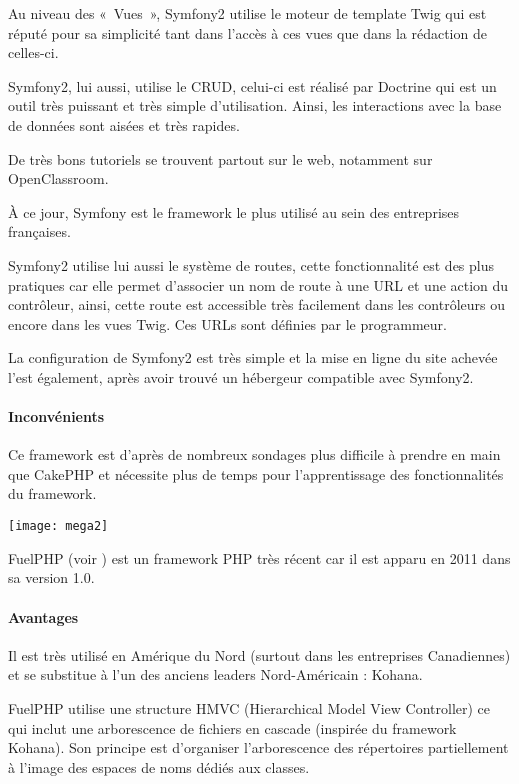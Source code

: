 Au niveau des «~Vues~», Symfony2 utilise le moteur de template Twig qui est réputé pour sa simplicité tant dans l'accès à ces vues que dans la rédaction de celles-ci.

Symfony2, lui aussi, utilise le CRUD, celui-ci est réalisé par Doctrine qui est un outil très puissant et très simple d'utilisation. Ainsi, les interactions avec la base de données sont aisées et très rapides.

De très bons tutoriels se trouvent partout sur le web, notamment sur OpenClassroom.

À ce jour, Symfony est le framework le plus utilisé au sein des entreprises françaises.

Symfony2 utilise lui aussi le système de routes, cette fonctionnalité est des plus pratiques car elle permet d'associer un nom de route à une URL et une action du contrôleur, ainsi, cette route est accessible très facilement dans les contrôleurs ou encore dans les vues Twig. Ces URLs sont définies par le programmeur.

La configuration de Symfony2 est très simple et la mise en ligne du site achevée l'est également, après avoir trouvé un hébergeur compatible avec Symfony2.

\paragraph{Inconvénients}
Ce framework est d'après de nombreux sondages plus difficile à prendre en main que CakePHP et nécessite plus de temps pour l'apprentissage des fonctionnalités du framework.


\begin{center}\texttt{[image: mega2]}\end{center}

FuelPHP (voir \cite{fuel}) est un framework PHP très récent car il est apparu en 2011 dans sa version 1.0.

\paragraph{Avantages}
Il est très utilisé en Amérique du Nord (surtout dans les entreprises Canadiennes) et se substitue à l'un des anciens leaders Nord-Américain : Kohana.

FuelPHP utilise une structure HMVC (Hierarchical Model View Controller) ce qui inclut une arborescence de fichiers en cascade (inspirée du framework Kohana). Son principe est d'organiser l'arborescence des répertoires partiellement à l'image des espaces de noms dédiés aux classes.

